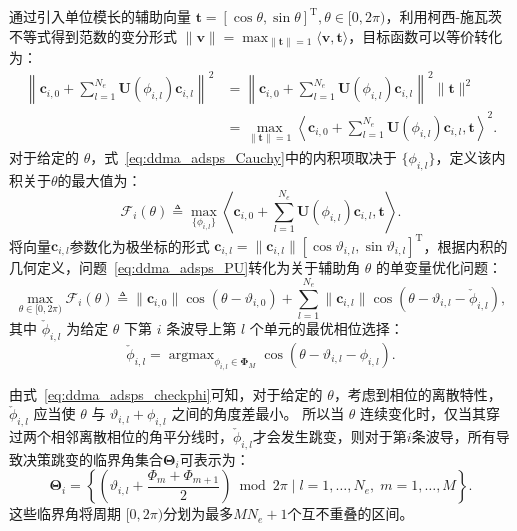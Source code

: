 通过引入单位模长的辅助向量 $\bm{t} = [\cos\theta, \sin\theta]^\mathrm{T},\theta \in [0, 2\pi)$，利用柯西-施瓦茨不等式得到范数的变分形式 $\|\bm v\| = \max_{\|\bm t\|=1} \langle \bm v, \bm t \rangle$，目标函数可以等价转化为：
\begin{align}
	\left\|\bm{c}_{i,0} + \sum_{l=1}^{N_e} \bm{U}(\phi_{i,l}) \bm{c}_{i,l}\right\|^2
	&= \left\|\bm{c}_{i,0} + \sum_{l=1}^{N_e} \bm{U}(\phi_{i,l}) \bm{c}_{i,l}\right\|^2 \|\bm{t}\|^2 \\
	&= \max_{\|\bm{t}\| = 1} \left\langle \bm{c}_{i,0} + \sum_{l=1}^{N_e} \bm{U}(\phi_{i,l}) \bm{c}_{i,l}, \bm{t} \right\rangle^2. \label{eq:ddma_adsps_Cauchy}
\end{align}
对于给定的 $\theta$，式~\eqref{eq:ddma_adsps_Cauchy}中的内积项取决于 $\{\phi_{i,l}\}$，定义该内积关于$\theta$的最大值为：
\begin{equation}\label{eq:ddma_adsps_F}
	\mathcal F_i (\theta) \triangleq \max_{\{\phi_{i,l}\}} \left\langle \bm{c}_{i,0} + \sum_{l=1}^{N_e} \bm{U}(\phi_{i,l}) \bm{c}_{i,l}, \bm{t} \right\rangle.
\end{equation}
将向量$\bm{c}_{i,l}$参数化为极坐标的形式 $\bm{c}_{i,l} = \|\bm{c}_{i,l}\| [\cos\vartheta_{i,l},\sin\vartheta_{i,l}]^\mathrm{T}$，根据内积的几何定义，问题~\eqref{eq:ddma_adsps_PU}转化为关于辅助角 $\theta$ 的单变量优化问题：
\begin{equation}\label{eq:ddma_adsps_Ftheta}
	\max_{\theta \in [0, 2\pi)} \mathcal{F}_i(\theta) \triangleq \|\bm{c}_{i,0}\|\cos(\theta - \vartheta_{i,0}) + \sum_{l=1}^{N_e} \|\bm{c}_{i,l}\| \cos(\theta - \vartheta_{i,l} - \check{\phi}_{i,l}),
\end{equation}
其中 $\check{\phi}_{i,l}$ 为给定 $\theta$ 下第 $i$ 条波导上第 $l$ 个单元的最优相位选择：
\begin{equation}\label{eq:ddma_adsps_checkphi}
	\check{\phi}_{i,l} = \mathop{\arg\max}_{\phi_{i,l} \in \bm \Phi_M} \cos(\theta - \vartheta_{i,l} - \phi_{i,l}).
\end{equation}

由式~\eqref{eq:ddma_adsps_checkphi}可知，对于给定的 $\theta$，考虑到相位的离散特性，$\check{\phi}_{i,l}$ 应当使 $\theta$ 与 $\vartheta_{i,l} + \phi_{i,l}$ 之间的角度差最小。
所以当 $\theta$ 连续变化时，仅当其穿过两个相邻离散相位的角平分线时，$\check{\phi}_{i,l}$才会发生跳变，则对于第$i$条波导，所有导致决策跳变的临界角集合$\bm \Theta_i$可表示为：
\begin{equation}\label{eq:ddma_adsps_Theta_i}
	\bm \Theta_i = \left\{ (\vartheta_{i,l} + \frac{\Phi_m + \Phi_{m+1}}{2}) \bmod 2\pi \mid l=1,\dots,N_e, \; m=1,\dots,M \right\}.
\end{equation}
这些临界角将周期 $[0, 2\pi)$分划为最多$MN_e+1$个互不重叠的区间。

